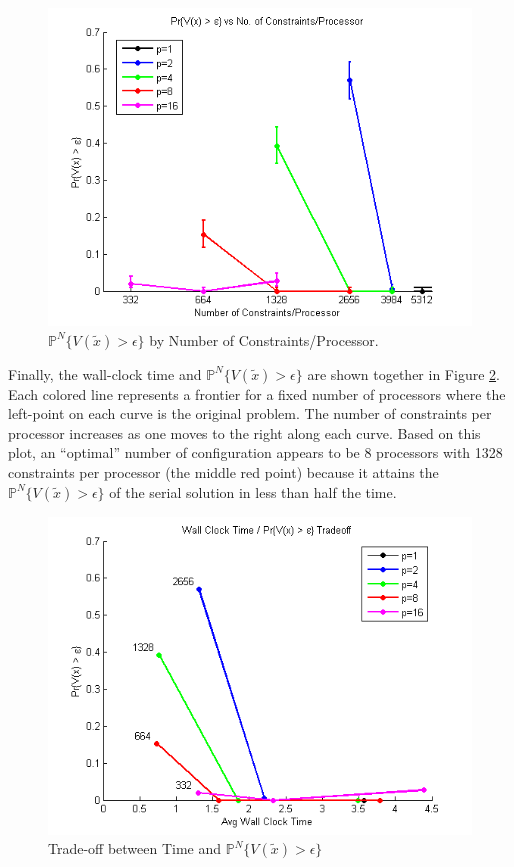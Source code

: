 \documentclass[12pt]{article}
\begin{document}
\begin{figure}[ht]
	\centering
		\includegraphics[scale=0.9]{../plot/figs/probviolprobgreateps_numconstraint.png}
	\caption{$\mathbb{P}^N\{V(\tilde{x}) > \epsilon \}$ by Number of Constraints/Processor.}
	\label{fig:probviolprobgreateps_numconstraint}
\end{figure}

Finally, the wall-clock time and $\mathbb{P}^N\{V(\tilde{x}) > \epsilon \}$ are shown together in Figure \ref{fig:wct_probviolprobgreateps_frontier_constraint}.
Each colored line represents a frontier for a fixed number of processors where the left-point on each curve is the original problem.
The number of constraints per processor increases as one moves to the right along each curve.
Based on this plot, an ``optimal'' number of configuration appears to be 8 processors with 1328 constraints per processor (the middle red point) because it attains the $\mathbb{P}^N\{V(\tilde{x}) > \epsilon \}$ of the serial solution in less than half the time.

\begin{figure}[ht]
	\centering
		\includegraphics[scale=0.9]{../plot/figs/wct_probviolprobgreateps_frontier_constraint.png}
	\caption{Trade-off between Time and $\mathbb{P}^N\{V(\tilde{x}) > \epsilon \}$}
	\label{fig:wct_probviolprobgreateps_frontier_constraint}
\end{figure}
\end{document}
